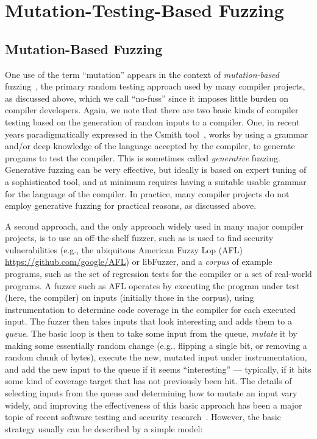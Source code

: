 \section{Mutation-Testing-Based Fuzzing}



\subsection{Mutation-Based Fuzzing}

One use of the term ``mutation'' appears in the context of \emph{mutation-based} fuzzing~\cite{ArtFuzz}, the primary random testing approach used by many compiler projects, as discussed above, which we call ``no-fuss'' since it imposes little burden on compiler developers.  Again, we note that there are two basic kinds of compiler testing based on the generation of random inputs to a compiler.  One, in recent years paradigmatically expressed in the Csmith tool~\cite{csmith}, works by using a grammar and/or deep knowledge of the language accepted by the compiler, to generate progams to test the compiler.  This is sometimes called \emph{generative} fuzzing.  Generative fuzzing can be very effective, but  ideally is based on expert tuning of a sophisticated tool, and at minimum requires having a suitable usable grammar for the language of the compiler.  In practice, many compiler projects do not employ generative fuzzing for practical reasons, as discussed above.

A second approach, and the only approach widely used in many major compiler projects, is to use an off-the-shelf fuzzer, such as is used to find security vulnerabilities (e.g., the ubiquitous American Fuzzy Lop (AFL) \url{https://github.com/google/AFL}) or libFuzzer, and a \emph{corpus} of example programs, such as the set of regression tests for the compiler or a set of real-world programs.  A fuzzer such as AFL operates by executing the program under test (here, the compiler) on inputs (initially those in the corpus), using instrumentation to determine code coverage in the compiler for each executed input.  The fuzzer then takes inputs that look interesting and adds them to a \emph{queue}.  The basic loop is then to take some input from the queue, \emph{mutate} it by making some essentially random change (e.g., flipping a single bit, or removing a random chunk of bytes), execute the new, mutated input under instrumentation, and add the new input to the queue if it seems ``interesting'' --- typically, if it hits some kind of coverage target that has not previously been hit.  The details of selecting inputs from the queue and determining how to mutate an input vary widely, and improving the effectiveness of this basic approach has been a major topic of recent software testing and security research~\cite{evalfuzz,BoehmeCR21,ArtFuzz}.  However, the basic strategy usually can be described by a simple model:

